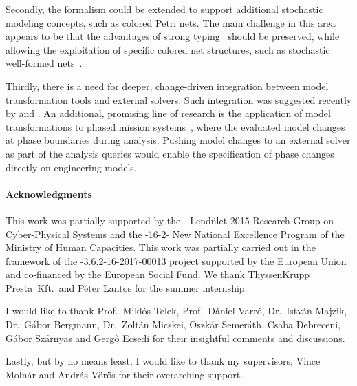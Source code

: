 Secondly, the  formalism could be extended to support additional stochastic modeling concepts, such as colored Petri nets. The main challenge in this area appears to be that the advantages of strong typing~\citep{Kindler07modular} should be preserved, while allowing the exploitation of specific colored net structures, such as stochastic well-formed nets~\citep{Chiola93swn}.

Thirdly, there is a need for deeper, change-driven integration between model transformation tools and external solvers. Such integration was suggested recently by \citet{Molnar16componentwise} and \citet[Section~2.8]{Meyers16thesis}. An additional, promising line of research is the application of model transformations to phased mission systems~\citep{Mura01pms}, where the evaluated model changes at phase boundaries during analysis. Pushing model changes to an external solver as part of the analysis queries would enable the specification of phase changes directly on engineering models.

\paragraph*{Acknowledgments}
{}

This work was partially supported by the - Lendület 2015 Research Group on Cyber-Physical Systems and the -16-2- New National Excellence Program of the Ministry of Human Capacities. This work was partially carried out in the framework of the -3.6.2-16-2017-00013 project supported by the European Union and co-financed by the European Social Fund. We thank ThyssenKrupp Presta~Kft.\ and Péter Lantos for the summer internship.

I would like to thank Prof.~Miklós Telek, Prof.~Dániel Varró, Dr.~István Majzik, Dr.~Gábor Bergmann, Dr.~Zoltán Micskei, Oszkár Semeráth, Csaba Debreceni, Gábor Szárnyas and Gergő Ecsedi for their insightful comments and discussions.

Lastly, but by no means least, I would like to thank my supervisors, Vince Molnár and András Vörös for their overarching support.